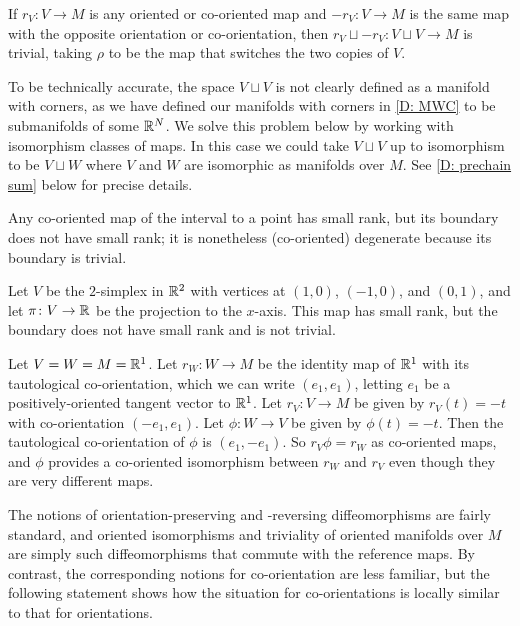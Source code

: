\begin{example}\label{E: copies}
	If $r_V \colon V \to M$ is any oriented or co-oriented map and $-r_V \colon V \to M$ is the same map with the opposite orientation or co-orientation, then $r_V \sqcup -r_V \colon V \sqcup V \to M$ is trivial, taking $\rho$ to be the map that switches the two copies of $V$.

	To be technically accurate, the space $V \sqcup V$ is not clearly defined as a manifold with corners, as we have defined our manifolds with corners in \cref{D: MWC} to be submanifolds of some $\mathbb{R}^N$.
	We solve this problem below by working with isomorphism classes of maps.
	In this case we could take $V \sqcup V$ up to isomorphism to be $V \sqcup W$ where $V$ and $W$ are isomorphic as manifolds over $M$.
	See \cref{D: prechain sum} below for precise details.
\end{example}

\begin{example}
	Any co-oriented map of the interval to a point has small rank, but its boundary does not have small rank; it is nonetheless (co-oriented) degenerate because its boundary is trivial.
\end{example}

\begin{example}\label{E: projected triangle}
	Let $V$ be the $2$-simplex in $\mathbb{R}^2$ with vertices at $(1,0)$, $(-1,0)$, and $(0,1)$, and let $\pi \colon V \to \mathbb{R}$ be the projection to the $x$-axis.
	This map has small rank, but the boundary does not have small rank and is not trivial.
\end{example}

\begin{example}
	Let $V = W = M = \mathbb{R}^1$.
	Let $r_W \colon W \to M$ be the identity map of $\mathbb{R}^1$ with its tautological co-orientation, which we can write $(e_1,e_1)$, letting $e_1$ be a positively-oriented tangent vector to $\mathbb{R}^1$.
	Let $r_V \colon V \to M$ be given by $r_V(t) = -t$ with co-orientation $(-e_1,e_1)$.
	Let $\phi \colon W \to V$ be given by $\phi(t) = -t$.
	Then the tautological co-orientation of $\phi$ is $(e_1,-e_1)$.
	So $r_V\phi = r_W$ as co-oriented maps, and $\phi$ provides a co-oriented isomorphism between $r_W$ and $r_V$ even though they are very different maps.
\end{example}

The notions of orientation-preserving and -reversing diffeomorphisms are fairly standard, and oriented isomorphisms and triviality of oriented manifolds over $M$ are simply such diffeomorphisms that commute with the reference maps.
By contrast, the corresponding notions for co-orientation are less familiar, but the following statement shows how the situation for co-orientations is locally similar to that for orientations.

